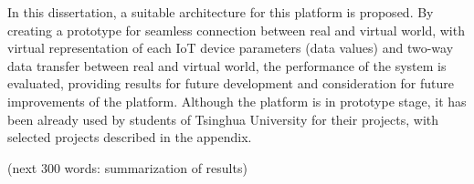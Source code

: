 \begin{abstract*}
  In this dissertation, a suitable architecture for this platform is proposed. By creating a prototype for seamless connection between real and virtual world, with virtual representation of each IoT device parameters (data values) and two-way data transfer between real and virtual world, the performance of the system is evaluated, providing results for future development and consideration for future improvements of the platform. Although the platform is in prototype stage, it has been already used by students of Tsinghua University for their projects, with selected projects described in the appendix. 
  
  (next 300 words: summarization of results)
 


\end{abstract*}
